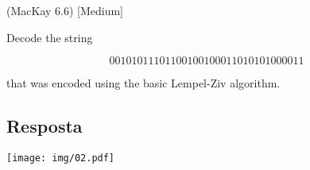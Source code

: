 (MacKay 6.6) [Medium]

Decode the string

\[00101011101100100100011010101000011\]

that was encoded using the basic Lempel-Ziv algorithm.

\subsection*{Resposta}

\texttt{[image: img/02.pdf]}
